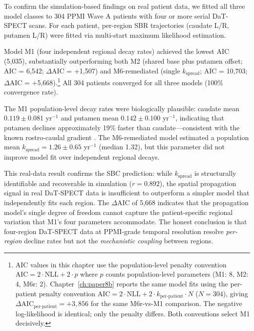 To confirm the simulation-based findings on real patient data, we fitted all three model classes to 304 PPMI Wave A patients with four or more serial DaT-SPECT scans. For each patient, per-region SBR trajectories (caudate L/R, putamen L/R) were fitted via multi-start maximum likelihood estimation.

Model M1 (four independent regional decay rates) achieved the lowest AIC (5,035), substantially outperforming both M2 (shared base plus putamen offset; AIC = 6,542; $\Delta$AIC = +1,507) and M6-remediated (single $k_{\text{spread}}$; AIC = 10,703; $\Delta$AIC = +5,668).\footnote{AIC values in this chapter use the population-level penalty convention $\text{AIC} = 2 \cdot \text{NLL} + 2 \cdot p$ where $p$ counts population-level parameters (M1: 8, M2: 4, M6r: 2). Chapter~\ref{ch:paper8b} reports the same model fits using the per-patient penalty convention $\text{AIC} = 2 \cdot \text{NLL} + 2 \cdot k_{\text{per-patient}} \cdot N$ ($N=304$), giving $\Delta$AIC$_{\text{per-patient}} = +3{,}856$ for the same M6r-vs-M1 comparison. The negative log-likelihood is identical; only the penalty differs. Both conventions select M1 decisively.} All 304 patients converged for all three models (100\% convergence rate).

The M1 population-level decay rates were biologically plausible: caudate mean $0.119 \pm 0.081$ yr$^{-1}$ and putamen mean $0.142 \pm 0.100$ yr$^{-1}$, indicating that putamen declines approximately 19\% faster than caudate---consistent with the known rostro-caudal gradient \cite{kish1988, brooks1990}. The M6-remediated model estimated a population mean $k_{\text{spread}} = 1.26 \pm 0.65$ yr$^{-1}$ (median 1.32), but this parameter did not improve model fit over independent regional decays.

This real-data result confirms the SBC prediction: while $k_{\text{spread}}$ is structurally identifiable and recoverable in simulation ($r = 0.892$), the spatial propagation signal in real DaT-SPECT data is insufficient to outperform a simpler model that independently fits each region. The $\Delta$AIC of 5,668 indicates that the propagation model's single degree of freedom cannot capture the patient-specific regional variation that M1's four parameters accommodate. The honest conclusion is that four-region DaT-SPECT data at PPMI-grade temporal resolution resolve \textit{per-region} decline rates but not the \textit{mechanistic coupling} between regions.

